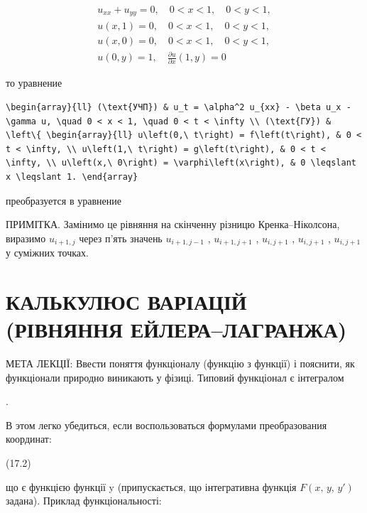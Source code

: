 \documentclass[
  ukrainian,
]{article}
\begin{document}
\[
\begin{array}{l} u_{xx} + u_{yy} = 0, \quad 0 < x < 1, \quad 0 < y < 1, \\ u(x, 1) = 0, \quad 0 < x < 1, \quad 0 < y < 1, \\ u(x, 0) = 0, \quad 0 < x < 1, \quad 0 < y < 1, \\ u(0, y) = 1, \quad \frac{\partial u}{\partial x}(1, y) = 0 \end{array}
\]

то уравнение

\begin{verbatim}
\begin{array}{ll} (\text{УЧП}) & u_t = \alpha^2 u_{xx} - \beta u_x - \gamma u, \quad 0 < x < 1, \quad 0 < t < \infty \\ (\text{ГУ}) & \left\{ \begin{array}{ll} u\left(0,\ t\right) = f\left(t\right), & 0 < t < \infty, \\ u\left(1,\ t\right) = g\left(t\right), & 0 < t < \infty, \\ u\left(x,\ 0\right) = \varphi\left(x\right), & 0 \leqslant x \leqslant 1. \end{array}
\end{verbatim}

преобразуется в уравнение

ПРИМІТКА. Замінимо це рівняння на скінченну різницю Кренка--Ніколсона,
виразимо \(u_{i+1,j}\) через п'ять значень \(u_{i+1,j-1}\) ,
\(u_{i+1,j+1}\) , \(u_{i,j+1}\) , \(u_{i,j+1}\) , \(u_{i,j+1}\) у
суміжних точках.

\section{КАЛЬКУЛЮС ВАРІАЦІЙ (РІВНЯННЯ
ЕЙЛЕРА--ЛАГРАНЖА)}\label{ux43aux430ux43bux44cux43aux443ux43bux44eux441-ux432ux430ux440ux456ux430ux446ux456ux439-ux440ux456ux432ux43dux44fux43dux43dux44f-ux435ux439ux43bux435ux440ux430ux43bux430ux433ux440ux430ux43dux436ux430}

МЕТА ЛЕКЦІЇ: Ввести поняття функціоналу (функцію з функції) і пояснити,
як функціонали природно виникають у фізиці. Типовий функціонал є
інтегралом

.

В этом легко убедиться, если воспользоваться формулами преобразования
координат:

(17.2)

що є функцією функції y (припускається, що інтегративна функція
\(F\left(x,\,y,\,y'\right)\) задана). Приклад функціональності:
\end{document}
